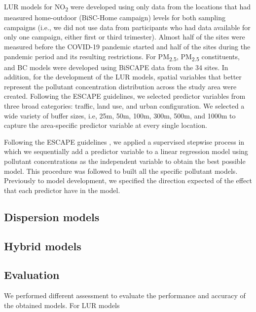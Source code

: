 \documentclass{article}
\begin{document}
LUR models for NO\textsubscript{2}  were developed using only data from the locations that had measured home-outdoor (BiSC-Home campaign) levels for both sampling campaigns (i.e., we did not use data from participants who had data available for only one campaign, either first or third trimester). Almost half of the sites were measured before the COVID-19 pandemic started and half of the sites during the pandemic period and its resulting restrictions. For PM\textsubscript{2.5}, PM\textsubscript{2.5} constituents, and BC models were developed using BiSCAPE data from the 34 sites. In addition, for the development of the LUR models, spatial variables that better represent the pollutant concentration distribution across the study area were created. Following the ESCAPE guidelines, we selected predictor variables from three broad categories: traffic, land use, and urban configuration. We selected a wide variety of buffer sizes, i.e, 25m, 50m, 100m, 300m, 500m, and 1000m to capture the area-specific predictor variable at every single location. 

Following the ESCAPE guidelines \cite{eeftens2012, beelen2013}, we applied a supervised stepwise process in which we sequentially add a predictor variable to a linear regression model using pollutant concentrations as the independent variable to obtain the best possible model. This procedure was followed to built all the specific pollutant models. Previously to model development, we specified the direction expected of the effect that each predictor have in the model. 




\subsection{Dispersion models}


\subsection{Hybrid models}






\subsection{Evaluation}
We performed different assessment to evaluate the performance and accuracy of the obtained models. For LUR models 



\end{document}

